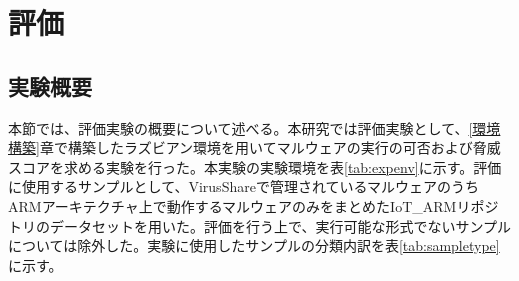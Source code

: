 \documentclass[12pt,a4paper,titlepage,report]{jsbook}
\begin{document}


\chapter{評価}
\section{実験概要}
本節では、評価実験の概要について述べる。本研究では評価実験として、\ref{環境構築}章で構築したラズビアン環境を用いてマルウェアの実行の可否および脅威スコアを求める実験を行った。本実験の実験環境を表\ref{tab:expenv}に示す。評価に使用するサンプルとして、VirusShareで管理されているマルウェアのうちARMアーキテクチャ上で動作するマルウェアのみをまとめたIoT\_ARMリポジトリ\cite{iotarm}のデータセットを用いた。評価を行う上で、実行可能な形式でないサンプルについては除外した。実験に使用したサンプルの分類内訳を表\ref{tab:sampletype}に示す。

\begin{table}[htbp]
	\caption{実験環境}
	\label{tab:expenv}
	\centering
	\\
\end{table}

\begin{table}[htbp]
	\caption{サンプルの分類内訳}
	\label{tab:sampletype}
	\centering
	\\
\end{table}
\end{document}
